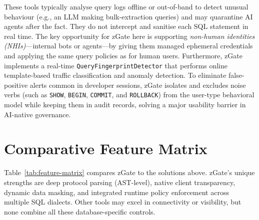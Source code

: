 These tools typically analyse query logs offline or out-of-band to detect unusual behaviour (e.g., an LLM making bulk-extraction queries) and may quarantine AI agents after the fact. They do not intercept and sanitise each SQL statement in real time. The key opportunity for zGate here is supporting \emph{non-human identities (NHIs)}---internal bots or agents---by giving them managed ephemeral credentials and applying the same query policies as for human users. Furthermore, zGate implements a real-time \texttt{QueryFingerprintDetector} that performs online template-based traffic classification and anomaly detection. To eliminate false-positive alerts common in developer sessions, zGate isolates and excludes noise verbs (such as \texttt{SHOW}, \texttt{BEGIN}, \texttt{COMMIT}, and \texttt{ROLLBACK}) from the user-type behavioral model while keeping them in audit records, solving a major usability barrier in AI-native governance.

\section{Comparative Feature Matrix}

Table~\ref{tab:feature-matrix} compares zGate to the solutions above. zGate's unique strengths are deep protocol parsing (AST-level), native client transparency, dynamic data masking, and integrated runtime policy enforcement across multiple SQL dialects. Other tools may excel in connectivity or visibility, but none combine all these database-specific controls.

